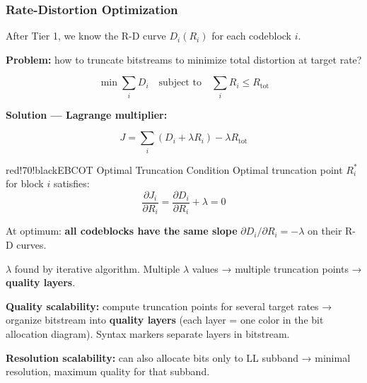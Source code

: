 \begin{center}\end{center}

\subsubsection{Rate-Distortion Optimization}

After Tier 1, we know the R-D curve $D_i(R_i)$ for each codeblock $i$.

\textbf{Problem:} how to truncate bitstreams to minimize total distortion at target rate?

\[
\min \sum_i D_i \quad \text{subject to} \quad \sum_i R_i \leq R_{\text{tot}}
\]

\textbf{Solution — Lagrange multiplier:}

\[
J = \sum_i \left(D_i + \lambda R_i\right) - \lambda R_{\text{tot}}
\]

\begin{calloutbox}{red!70!black}{EBCOT Optimal Truncation Condition}
Optimal truncation point $R_i^*$ for block $i$ satisfies:
\[
\frac{\partial J_i}{\partial R_i} = \frac{\partial D_i}{\partial R_i} + \lambda = 0
\]

At optimum: \textbf{all codeblocks have the same slope} $\partial D_i / \partial R_i = -\lambda$ on their R-D curves.

$\lambda$ found by iterative algorithm. Multiple $\lambda$ values → multiple truncation points → \textbf{quality layers}.
\end{calloutbox}

\begin{center}\end{center}

\textbf{Quality scalability:} compute truncation points for several target rates → organize bitstream into \textbf{quality layers} (each layer = one color in the bit allocation diagram). Syntax markers separate layers in bitstream.

\textbf{Resolution scalability:} can also allocate bits only to LL subband → minimal resolution, maximum quality for that subband.

